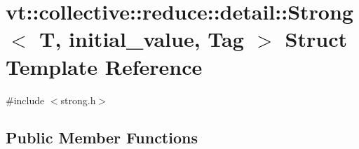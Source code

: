 \hypertarget{structvt_1_1collective_1_1reduce_1_1detail_1_1_strong}{}\section{vt\+:\+:collective\+:\+:reduce\+:\+:detail\+:\+:Strong$<$ T, initial\+\_\+value, Tag $>$ Struct Template Reference}
\label{structvt_1_1collective_1_1reduce_1_1detail_1_1_strong}


{\ttfamily \#include $<$strong.\+h$>$}

\subsection*{Public Member Functions}

